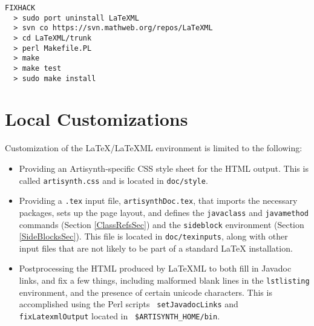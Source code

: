 \documentclass{article}
\begin{document}
\begin{lstlisting}FIXHACK
  > sudo port uninstall LaTeXML
  > svn co https://svn.mathweb.org/repos/LaTeXML
  > cd LaTeXML/trunk
  > perl Makefile.PL
  > make
  > make test
  > sudo make install
\end{lstlisting}

\section{Local Customizations}
\label{LocalCustomizationSec}

Customization of the LaTeX/LaTeXML environment is limited to the
following:

\begin{itemize}

\item Providing an Artisynth-specific CSS style sheet for the HTML output.
This is called {\tt artisynth.css} and is located in {\tt doc/style}.

\item Providing a {\tt .tex} input file, {\tt artisynthDoc.tex}, that
imports the necessary packages, sets up the page layout, and defines
the {\tt \BKS javaclass} and {\tt \BKS javamethod} commands (Section
\ref{ClassRefsSec}) and the {\tt sideblock} environment (Section
\ref{SideBlocksSec}).  This file is located in {\tt doc/texinputs},
along with other input files that are not likely to be part of a
standard LaTeX installation.

\item Postprocessing the HTML produced by LaTeXML to both fill in
Javadoc links, and fix a few things, including malformed blank lines
in the {\tt lstlisting} environment, and the presence of certain
unicode characters.  This is accomplished using the Perl scripts {\tt
setJavadocLinks} and {\tt fixLatexmlOutput} located in {\tt
\$ARTISYNTH\_HOME/bin}.

\end{itemize}
\end{document}
